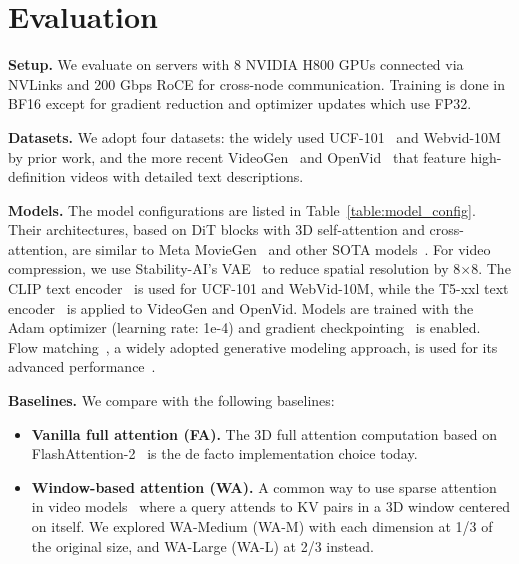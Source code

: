 \section{Evaluation}\label{sec:eval}

\noindent\textbf{Setup.} We evaluate on servers with 8 NVIDIA H800 GPUs connected via NVLinks and 200 Gbps RoCE for cross-node communication. 
Training is done in BF16 except for gradient reduction and optimizer updates which use FP32.

\noindent\textbf{Datasets.} We adopt four datasets: the widely used UCF-101~\cite{soomro2012ucf101} and Webvid-10M~\cite{Bain21webvid_10M} by prior work, and the more recent VideoGen~\cite{tan2024vidgen} and OpenVid~\cite{nan2024openvid} that feature high-definition videos with detailed text descriptions.

\noindent\textbf{Models.} The model configurations are listed in Table~\ref{table:model_config}. Their architectures, based on DiT blocks with 3D self-attention and cross-attention, are similar to Meta MovieGen~\cite{polyak2024movie} and other SOTA models~\cite{klingvideo,HunyuanVideo}. For video compression, we use Stability-AI's VAE~\cite{stabilityai_stable_diffusion} to reduce spatial resolution by 8$\times$8. The CLIP text encoder~\cite{clip_textembedder} is used for UCF-101 and WebVid-10M, while the T5-xxl text encoder~\cite{T5encoder} is applied to VideoGen and OpenVid. Models are trained with the Adam optimizer (learning rate: 1e-4) and gradient checkpointing~\cite{chen2016gradcheckpoint} is enabled. Flow matching~\cite{lipman2022flowmatching}, a widely adopted generative modeling approach, is used for its advanced performance~\cite{OpenSora,HunyuanVideo,polyak2024movie}.

\noindent\textbf{Baselines.} We compare \sys with the following baselines: %

\begin{itemize}[leftmargin=*]
    \item \textbf{Vanilla full attention (FA).} The 3D full attention computation based on FlashAttention-2~\cite{dao2023flashattention2,tritonflashattention} is the de facto implementation choice today.

    \item \textbf{Window-based attention (WA).} A common way to use sparse attention in video models~\cite{hassani2023neighborhood,zhang2025fastvideotileatten} where a query attends to KV pairs in a 3D window centered on itself. We explored WA-Medium ({WA-M}) with each dimension at 1/3 of the original size, and WA-Large ({WA-L}) at 2/3 instead.
\end{itemize}

